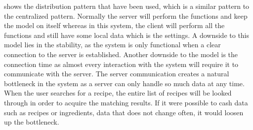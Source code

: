  shows the distribution pattern that have been used, which is a similar pattern to the centralized pattern. Normally the server will perform the functions and keep the model on itself whereas in this system, the client will perform all the functions and still have some local data which is the settings. A downside to this model lies in the stability, as the system is only functional when a clear connection to the server is established. Another downside to the model is the connection time as almost every interaction with the system will require it to communicate with the server. The server communication creates a natural bottleneck in the system as a server can only handle so much data at any time. When the user searches for a recipe, the entire list of recipes will be looked through in order to acquire the matching results. If it were possible to cash data such as recipes or ingredients, data that does not change often, it would loosen up the bottleneck.